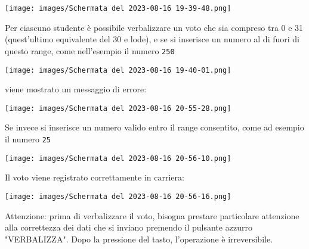 \documentclass{article}
\begin{document}
    \texttt{[image: images/Schermata del 2023-08-16 19-39-48.png]}

    Per ciascuno studente è possibile verbalizzare un voto che sia compreso tra 0 e 31 (quest'ultimo equivalente del 30 e lode),
    e se si inserisce un numero al di fuori di questo range, come nell'esempio il numero \texttt{250}

    \texttt{[image: images/Schermata del 2023-08-16 19-40-01.png]}

    viene mostrato un messaggio di errore:

    \texttt{[image: images/Schermata del 2023-08-16 20-55-28.png]}

    Se invece si inserisce un numero valido entro il range consentito, come ad esempio il numero \texttt{25}

    \texttt{[image: images/Schermata del 2023-08-16 20-56-10.png]}

    Il voto viene registrato correttamente in carriera:

    \texttt{[image: images/Schermata del 2023-08-16 20-56-16.png]}

    Attenzione: prima di verbalizzare il voto, bisogna prestare particolare attenzione alla correttezza dei dati che si inviano premendo il pulsante azzurro "VERBALIZZA". Dopo la pressione del tasto, l'operazione è irreversibile.
\end{document}
